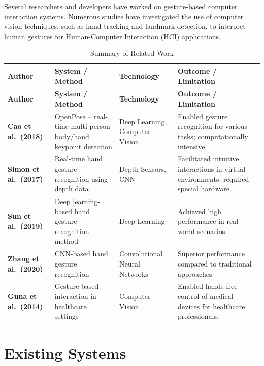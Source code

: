 \documentclass[12pt,a4paper]{report}
\begin{document}
Several researchers and developers have worked on gesture-based computer interaction systems.
Numerous studies have investigated the use of computer vision techniques, such as hand
tracking and landmark detection, to interpret human gestures for Human-Computer Interaction
(HCI) applications.

\begin{longtable}{>{\bfseries}p{3cm} p{3.5cm} p{2.5cm} p{4.5cm}}
\caption{Summary of Related Work} \label{tab:litsurvey} \\
\toprule
\textbf{Author} & \textbf{System / Method} & \textbf{Technology} & \textbf{Outcome / Limitation} \\
\midrule
\endfirsthead
\toprule
\textbf{Author} & \textbf{System / Method} & \textbf{Technology} & \textbf{Outcome / Limitation} \\
\midrule
\endhead
\bottomrule
\endfoot
Cao et al.\ (2018)  & OpenPose -- real-time multi-person body/hand keypoint detection & Deep Learning, Computer Vision & Enabled gesture recognition for various tasks; computationally intensive. \\[4pt]
Simon et al.\ (2017) & Real-time hand gesture recognition using depth data & Depth Sensors, CNN & Facilitated intuitive interactions in virtual environments; required special hardware. \\[4pt]
Sun et al.\ (2019)  & Deep learning-based hand gesture recognition method & Deep Learning & Achieved high performance in real-world scenarios. \\[4pt]
Zhang et al.\ (2020) & CNN-based hand gesture recognition & Convolutional Neural Networks & Superior performance compared to traditional approaches. \\[4pt]
Guna et al.\ (2014) & Gesture-based interaction in healthcare settings & Computer Vision & Enabled hands-free control of medical devices for healthcare professionals. \\
\end{longtable}

\section{Existing Systems}
\end{document}
